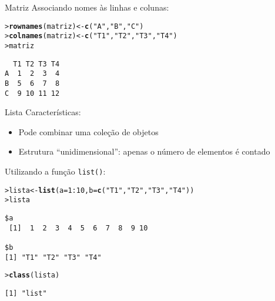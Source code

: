 \documentclass[10pt,handout]{beamer}\usepackage{graphicx, color}
\makeatletter
\newcommand{\hlfunctioncall}[1]{\textcolor[rgb]{0,0,0.545098039215686}{\textbf{#1}}}%
\newcommand{\hlstring}[1]{\textcolor[rgb]{0.282352941176471,0.23921568627451,0.545098039215686}{#1}}%
\newenvironment{kframe}{%
 \def\at@end@of@kframe{}%
 \ifinner\ifhmode%
  \def\at@end@of@kframe{\end{minipage}}%
  \begin{minipage}{\columnwidth}%
 \fi\fi%
 \def\FrameCommand##1{\hskip\@totalleftmargin \hskip-\fboxsep
 \colorbox{shadecolor}{##1}\hskip-\fboxsep
     \hskip-\linewidth \hskip-\@totalleftmargin \hskip\columnwidth}%
 \MakeFramed {\advance\hsize-\width
   \@totalleftmargin\z@ \linewidth\hsize
   \@setminipage}}%
 {\par\unskip\endMakeFramed%
 \at@end@of@kframe}
\newenvironment{knitrout}{}{} %
\makeatother
\begin{document}
\begin{frame}[fragile=singleslide]{Matriz}
Associando nomes às linhas e colunas:
\begin{knitrout}\small
{}\color{fgcolor}\begin{kframe}
\begin{alltt}
> \hlfunctioncall{rownames}(matriz) <- \hlfunctioncall{c}(\hlstring{"A"},\hlstring{"B"},\hlstring{"C"})
> \hlfunctioncall{colnames}(matriz) <- \hlfunctioncall{c}(\hlstring{"T1"},\hlstring{"T2"},\hlstring{"T3"},\hlstring{"T4"})
> matriz
\end{alltt}
\begin{verbatim}
  T1 T2 T3 T4
A  1  2  3  4
B  5  6  7  8
C  9 10 11 12
\end{verbatim}
\end{kframe}
\end{knitrout}

\end{frame}

\begin{frame}[fragile=singleslide]{Lista}
Características:
\begin{itemize}
\item Pode combinar uma coleção de objetos
\item Estrutura ``unidimensional'': apenas o número de elementos é
  contado
\end{itemize}
Utilizando a função \texttt{list()}:
\begin{knitrout}\small
{}\color{fgcolor}\begin{kframe}
\begin{alltt}
> lista <- \hlfunctioncall{list}(a = 1:10, b = \hlfunctioncall{c}(\hlstring{"T1"},\hlstring{"T2"},\hlstring{"T3"},\hlstring{"T4"}))
> lista
\end{alltt}
\begin{verbatim}
$a
 [1]  1  2  3  4  5  6  7  8  9 10

$b
[1] "T1" "T2" "T3" "T4"

\end{verbatim}
\begin{alltt}
> \hlfunctioncall{class}(lista)
\end{alltt}
\begin{verbatim}
[1] "list"
\end{verbatim}
\end{kframe}
\end{knitrout}

\end{frame}
\end{document}
